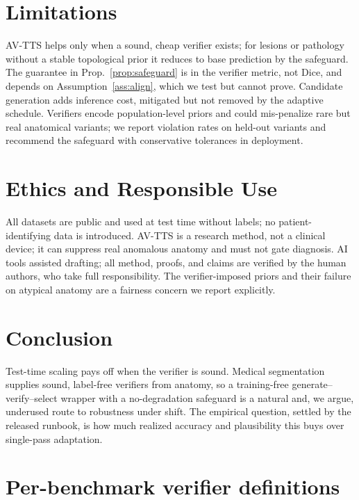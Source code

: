 \documentclass[10pt]{article}
\begin{document}
\section{Limitations}
AV-TTS helps only when a sound, cheap verifier exists; for lesions or pathology without a stable topological prior it reduces to base prediction by the safeguard. The guarantee in Prop.~\ref{prop:safeguard} is in the verifier metric, not Dice, and depends on Assumption~\ref{ass:align}, which we test but cannot prove. Candidate generation adds inference cost, mitigated but not removed by the adaptive schedule. Verifiers encode population-level priors and could mis-penalize rare but real anatomical variants; we report violation rates on held-out variants and recommend the safeguard with conservative tolerances in deployment.

\section*{Ethics and Responsible Use}
All datasets are public and used at test time without labels; no patient-identifying data is introduced. AV-TTS is a research method, not a clinical device; it can suppress real anomalous anatomy and must not gate diagnosis. AI tools assisted drafting; all method, proofs, and claims are verified by the human authors, who take full responsibility. The verifier-imposed priors and their failure on atypical anatomy are a fairness concern we report explicitly.

\section{Conclusion}
Test-time scaling pays off when the verifier is sound. Medical segmentation supplies sound, label-free verifiers from anatomy, so a training-free generate--verify--select wrapper with a no-degradation safeguard is a natural and, we argue, underused route to robustness under shift. The empirical question, settled by the released runbook, is how much realized accuracy and plausibility this buys over single-pass adaptation.




\appendix
\section{Per-benchmark verifier definitions}\label{app:verifiers}
\end{document}
